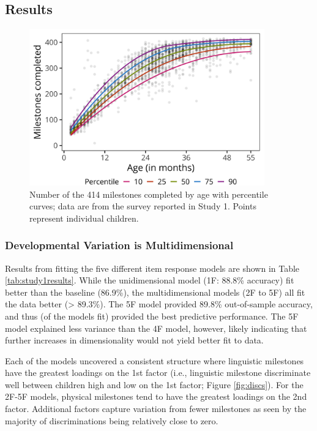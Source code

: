 \documentclass[man, floatsintext]{apa7}
\begin{document}
\subsection{Results}

\begin{figure}
\centering
\includegraphics[width=4in]{figures/01_achieve_by_age.png}
\caption{Number of the 414 milestones completed by age with percentile curves; data are from the survey reported in Study 1. Points represent individual children.}
\label{fig:partage}
\end{figure}

\subsubsection{Developmental Variation is
Multidimensional}\label{developmental-variation-is-multidimensional}

Results from fitting the five different item response models are shown
in Table \ref{tab:study1results}. While the unidimensional model (1F:
88.8\% accuracy) fit better than the baseline (86.9\%), the
multidimensional models (2F to 5F) all fit the data better
(\textgreater{} 89.3\%). The 5F model provided 89.8\% out-of-sample
accuracy, and thus (of the models fit) provided the best predictive
performance. The 5F model explained less variance than the 4F model, however,
likely indicating that further increases in dimensionality would not yield better fit to data. 

Each of the models uncovered a consistent structure where linguistic milestones have
the greatest loadings on the 1st factor (i.e., linguistic milestone
discriminate well between children high and low on the 1st factor; Figure \ref{fig:discs}). For the 2F-5F models, physical milestones tend to have the greatest loadings
on the 2nd factor. Additional factors capture variation from fewer
milestones as seen by the majority of discriminations being relatively close to zero.
\end{document}
